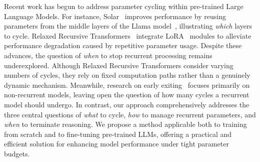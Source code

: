 Recent work has begun to address parameter cycling within pre-trained Large Language Models. For instance, {Solar}~\cite{kim2023solar} improves performance by reusing parameters from the middle layers of the Llama model~\cite{touvron2023llama}, illustrating \emph{which} layers to cycle. Relaxed Recursive Transformers~\cite{bae2024relaxed} integrate LoRA~\cite{hu2021lora} modules to alleviate performance degradation caused by repetitive parameter usage. Despite these advances, the question of \emph{when} to stop recurrent processing remains underexplored. Although Relaxed Recursive Transformers consider varying numbers of cycles, they rely on fixed computation paths rather than a genuinely dynamic mechanism. Meanwhile, research on early exiting~\cite{chen2023ee,pan2024ee} focuses primarily on non-recurrent models, leaving open the question of how many cycles a recurrent model should undergo.
In contrast, our approach comprehensively addresses the three central questions of \emph{what} to cycle, \emph{how} to manage recurrent parameters, and \emph{when} to terminate reasoning. We propose a method applicable both to training from scratch and to fine-tuning pre-trained LLMs, offering a practical and efficient solution for enhancing model performance under tight parameter budgets.
